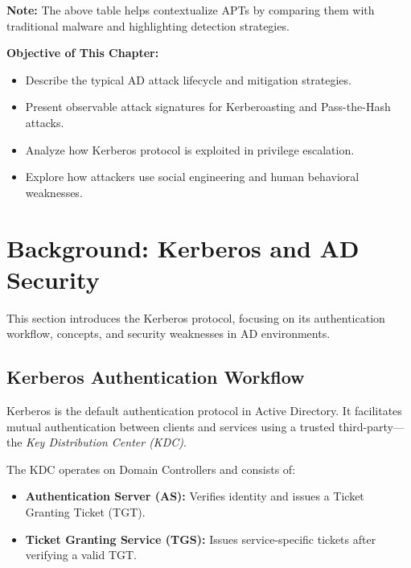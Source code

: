 \textbf{Note:} The above table helps contextualize APTs by comparing them with traditional malware and highlighting detection strategies.

\bigskip

\textbf{Objective of This Chapter:}
\begin{itemize}
    \item Describe the typical AD attack lifecycle and mitigation strategies.
    \item Present observable attack signatures for Kerberoasting and Pass-the-Hash attacks.
    \item Analyze how Kerberos protocol is exploited in privilege escalation.
    \item Explore how attackers use social engineering and human behavioral weaknesses.
\end{itemize}

\section{Background: Kerberos and AD Security}

This section introduces the Kerberos protocol, focusing on its authentication workflow, concepts, and security weaknesses in AD environments.

\subsection{Kerberos Authentication Workflow}

Kerberos is the default authentication protocol in Active Directory. It facilitates mutual authentication between clients and services using a trusted third-party—the \textit{Key Distribution Center (KDC)}.

The KDC operates on Domain Controllers and consists of:
\begin{itemize}
    \item \textbf{Authentication Server (AS):} Verifies identity and issues a Ticket Granting Ticket (TGT).
    \item \textbf{Ticket Granting Service (TGS):} Issues service-specific tickets after verifying a valid TGT.
\end{itemize}

